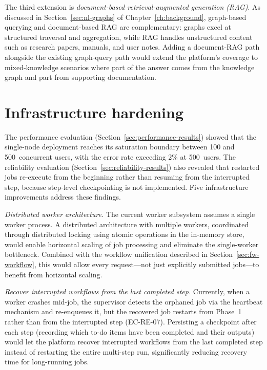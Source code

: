 \documentclass[a4paper,noexaminfo]{sapthesis}
\begin{document}
The third extension is \emph{document-based retrieval-augmented
generation (RAG)}.  As discussed in Section~\ref{sec:nl-graphs} of
Chapter~\ref{ch:background}, graph-based querying and document-based RAG
are complementary: graphs excel at structured traversal and aggregation,
while RAG handles unstructured content such as research papers, manuals,
and user notes.  Adding a document-RAG path alongside the existing
graph-query path would extend the platform's coverage to
mixed-knowledge scenarios where part of the answer comes from the
knowledge graph and part from supporting documentation.

\section{Infrastructure hardening}
\label{sec:fw-infra}

The performance evaluation (Section~\ref{sec:performance-results})
showed that the single-node deployment reaches its saturation boundary
between 100 and 500~concurrent users, with the error rate exceeding
2\% at 500~users.  The reliability evaluation
(Section~\ref{sec:reliability-results}) also revealed that restarted jobs
re-execute from the beginning rather than resuming from the interrupted
step, because step-level checkpointing is not implemented.  Five
infrastructure improvements address these findings.

\emph{Distributed worker architecture.}  The current worker subsystem
assumes a single worker process.  A distributed architecture with multiple
workers, coordinated through distributed locking using atomic
operations in the in-memory store, would enable horizontal scaling of
job processing and eliminate the single-worker bottleneck.  Combined with the workflow unification described in
Section~\ref{sec:fw-workflow}, this would allow every request---not just
explicitly submitted jobs---to benefit from horizontal scaling.

\emph{Recover interrupted workflows from the last completed step.}
Currently, when a worker crashes mid-job, the supervisor detects the
orphaned job via the heartbeat mechanism and re-enqueues it, but the
recovered job restarts from Phase~1 rather than from the interrupted step
(EC-RE-07).  Persisting a checkpoint after each step (recording which
to-do items have been completed and their outputs) would let the platform
recover interrupted workflows from the last completed step instead of
restarting the entire multi-step run, significantly reducing recovery
time for long-running jobs.
\end{document}
